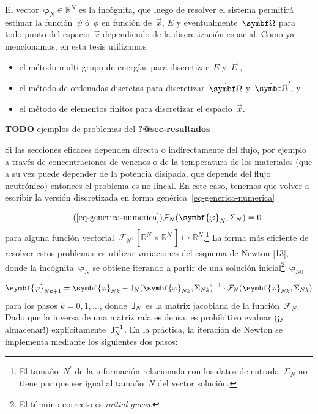 \documentclass[
  12pt,
  a4paper,
  table]{scrbook}
\providecommand{\tightlist}{%
  \setlength{\itemsep}{0pt}\setlength{\parskip}{0pt}}\usepackage{longtable,booktabs,array}
\theoremstyle{plain}
\theoremstyle{definition}
\theoremstyle{plain}
\theoremstyle{plain}
\theoremstyle{remark}
\begin{document}
El vector~\(\symbf{\varphi}_N \in \mathbb{R}^N\) es la incógnita, que
luego de resolver el sistema permitirá estimar la función~\(\psi\)
ó~\(\phi\) en función de~\(\vec{x}\), \(E\) y
eventualmente~\(\omegaversor\) para todo punto del espacio~\(\vec{x}\)
dependiendo de la discretización espacial. Como ya mencionamos, en esta
tesis utilizamos

\begin{itemize}
\tightlist
\item
  el método multi-grupo de energías para discretizar~\(E\)
  y~\(E^\prime\),
\item
  el método de ordenadas discretas para discretizar~\(\omegaversor\)
  y~\(\omegaprimaversor\), y
\item
  el método de elementos finitos para discretizar el
  espacio~\(\vec{x}\).
\end{itemize}

\textbf{TODO} ejemplos de problemas del \textbf{?@sec-resultados}

Si las secciones eficaces dependen directa o indirectamente del flujo,
por ejemplo a través de concentraciones de venenos o de la temperatura
de los materiales (que a su vez puede depender de la potencia disipada,
que depende del flujo neutrónico) entonces el problema es no lineal. En
este caso, tenemos que volver a escribir la versión discretizada en
forma genérica~\ref{eq-generica-numerica}

\[ \tag{\ref{eq-generica-numerica}}
\mathcal{F}_N(\symbf{\varphi}_N, \Sigma_N) = 0
\] para alguna función
vectorial~\(\mathcal{F}_N : [\mathbb{R}^{N} \times \mathbb{R}^{N^\prime}] \mapsto \mathbb{R}^{N}\).\footnote{El
  tamaño~\(N^\prime\) de la información relacionada con los datos de
  entrada~\(\Sigma_N\) no tiene por que ser igual al tamaño~\(N\) del
  vector solución.} La forma más eficiente de resolver estos problemas
es utilizar variaciones del esquema de Newton {[}13{]}, donde la
incógnita~\(\symbf{\varphi}_N\) se obtiene iterando a partir de una
solución inicial\footnote{El término correcto es
  \foreignlanguage{american}{\emph{initial guess}}.}~\(\symbf{\varphi}_{N0}\)

\[
\symbf{\varphi}_{Nk+1} = \symbf{\varphi}_{Nk} - \mat{J}_N(\symbf{\varphi}_{Nk}, \Sigma_{Nk})^{-1} \cdot \mathcal{F}_N(\symbf{\varphi}_{Nk}, \Sigma_{Nk})
\] para los pasos \(k=0,1,\dots\), donde~\(\mathsf{J}_N\) es la matrix
jacobiana de la función~\(\mathcal{F}_N\). Dado que la inversa de una
matriz rala es densa, es prohibitivo evaluar (¡y almacenar!)
explícitamente~\(\mathsf{J}_N^{-1}\). En la práctica, la iteración de
Newton se implementa mediante los siguientes dos pasos:
\end{document}
